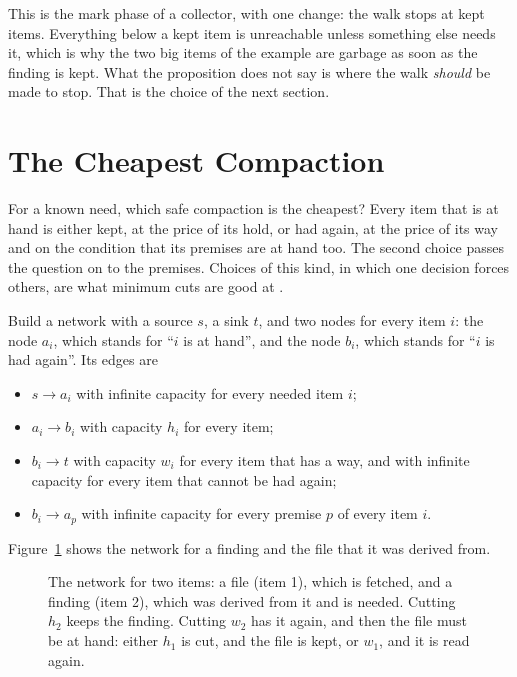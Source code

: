 \documentclass[acmsmall,nonacm,screen]{acmart}
\begin{document}
This is the mark phase of a collector, with one change: the walk stops at kept items.
Everything below a kept item is unreachable unless something else needs it, which is why
the two big items of the example are garbage as soon as the finding is kept. What the
proposition does not say is where the walk \emph{should} be made to stop. That is the choice
of the next section.

\section{The Cheapest Compaction}\label{sec:cut}

For a known need, which safe compaction is the cheapest? Every item that is at hand is
either kept, at the price of its hold, or had again, at the price of its way and on the
condition that its premises are at hand too. The second choice passes the question on to
the premises. Choices of this kind, in which one decision forces others, are what minimum
cuts are good at \citep{Picard1976}.

Build a network with a source $s$, a sink $t$, and two nodes for every item $i$: the node
$a_i$, which stands for ``$i$ is at hand'', and the node $b_i$, which stands for ``$i$ is
had again''. Its edges are
\begin{itemize}
\item $s \to a_i$ with infinite capacity for every needed item $i$;
\item $a_i \to b_i$ with capacity $h_i$ for every item;
\item $b_i \to t$ with capacity $w_i$ for every item that has a way, and with infinite
  capacity for every item that cannot be had again;
\item $b_i \to a_p$ with infinite capacity for every premise $p$ of every item $i$.
\end{itemize}
Figure~\ref{fig:network} shows the network for a finding and the file that it was derived
from.

\begin{figure}
\centering
{}
\caption{The network for two items: a file (item 1), which is fetched, and a finding (item 2),
which was derived from it and is needed. Cutting $h_2$ keeps the finding. Cutting $w_2$ has
it again, and then the file must be at hand: either $h_1$ is cut, and the file is kept, or
$w_1$, and it is read again.}\label{fig:network}
\end{figure}
\end{document}
